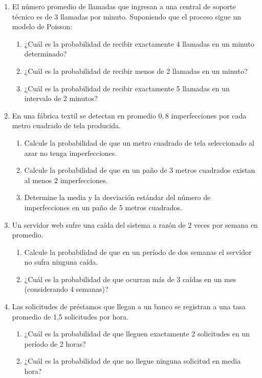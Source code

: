 \documentclass[letterpaper,12pt,spanish]{article}
\begin{document}
\begin{enumerate}[label=\arabic*.]
    \item El número promedio de llamadas que ingresan a una central de soporte técnico es de 3 llamadas por minuto. Suponiendo que el proceso sigue un modelo de Poisson:
    \begin{enumerate}[label=\alph*)]
        \item ¿Cuál es la probabilidad de recibir exactamente 4 llamadas en un minuto determinado?
        \item ¿Cuál es la probabilidad de recibir menos de 2 llamadas en un minuto?
        \item ¿Cuál es la probabilidad de recibir exactamente 5 llamadas en un intervalo de 2 minutos?
    \end{enumerate}

    \item En una fábrica textil se detectan en promedio $0{,}8$ imperfecciones por cada metro cuadrado de tela producida.
    \begin{enumerate}[label=\alph*)]
        \item Calcule la probabilidad de que un metro cuadrado de tela seleccionado al azar no tenga imperfecciones.
        \item Calcule la probabilidad de que en un paño de 3 metros cuadrados existan al menos 2 imperfecciones.
        \item Determine la media y la desviación estándar del número de imperfecciones en un paño de 5 metros cuadrados.
    \end{enumerate}

    \item Un servidor web sufre una caída del sistema a razón de 2 veces por semana en promedio.
    \begin{enumerate}[label=\alph*)]
        \item Calcule la probabilidad de que en un período de dos semanas el servidor no sufra ninguna caída.
        \item ¿Cuál es la probabilidad de que ocurran más de 3 caídas en un mes (considerando 4 semanas)?
    \end{enumerate}

    \item Las solicitudes de préstamos que llegan a un banco se registran a una tasa promedio de 1,5 solicitudes por hora.
    \begin{enumerate}[label=\alph*)]
        \item ¿Cuál es la probabilidad de que lleguen exactamente 2 solicitudes en un período de 2 horas?
        \item ¿Cuál es la probabilidad de que no llegue ninguna solicitud en media hora?
    \end{enumerate}


\end{enumerate}
\end{document}
